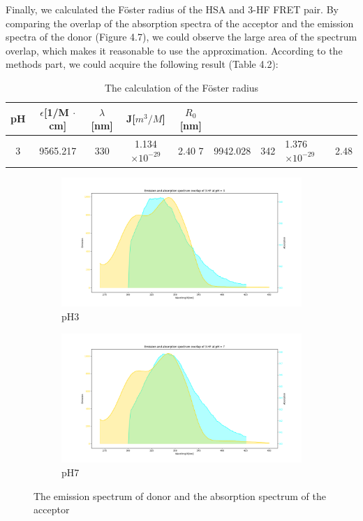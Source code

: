 \documentclass[a4paper,english,12pt,bibliography=totoc]{scrreprt}
\begin{document}
Finally, we calculated the Föster radius of the HSA and 3-HF FRET pair. By comparing the overlap of the absorption spectra of the acceptor and the emission spectra of the donor (Figure 4.7), we could observe the large area of the spectrum overlap, which makes it reasonable to use the approximation. According to the methods part, we could acquire the following result (Table 4.2):
\begin{table}[hbpt] %
    \centering
    \begin{tabular}{c|c|c|c|c}
        \hline
         pH& $\epsilon$[1/M $\cdot$ cm] &$\lambda$[nm]&J[$m^3/M$]&$R_0$[nm]\\
         & 9565.217 & 330 & 1.134 $\times 10^{-29}$&2.40
         7& 9942.028 & 342 & 1.376 $\times 10^{-29}$&2.48
    \end{tabular}
    \caption{The calculation of the Föster radius}
    \label{tab:my_label}
\end{table}

\begin{figure}[htbp]
    \centering
    \begin{subfigure}[b]{0.45\textwidth}
        \includegraphics[width=\textwidth]{Figures/spectrum_overlap_ph3.png}
        \caption{pH3}
    \end{subfigure}
    \quad %
    \begin{subfigure}[b]{0.45\textwidth}
        \includegraphics[width=\textwidth]{Figures/spectrum_overlap_ph7.png}
        \caption{pH7}
    \end{subfigure}
    \caption{The emission spectrum of donor and the absorption spectrum of the acceptor}
\end{figure}
\end{document}
